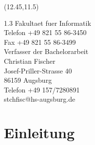 \documentclass{wissdoc}
\begin{document}
\begin{textblock}{5}(12.45,11.5)
	\scriptsize
		\begin{flushleft}
			\begin{spacing} {1.3}
				Fakultaet fuer Informatik\\
				Telefon +49 821 55 86-3450\\
				Fax \hspace{10pt} +49 821 55 86-3499\\
				\vspace{6pt}
				Verfasser der Bachelorarbeit\\
				Christian Fischer\\
				Josef-Priller-Strasse 40\\
				86159 Augsburg\\
				Telefon +49 157/7280891\\
				stchfisc@hs-augsburg.de\\
			\end{spacing}
		\end{flushleft}
	\end{textblock}
\pagebreak  %



%
\ifnotdraft{
\tableofcontents
}
\graphicspath{{figures/}}


                                               
\chapter{Einleitung}
\end{document}
